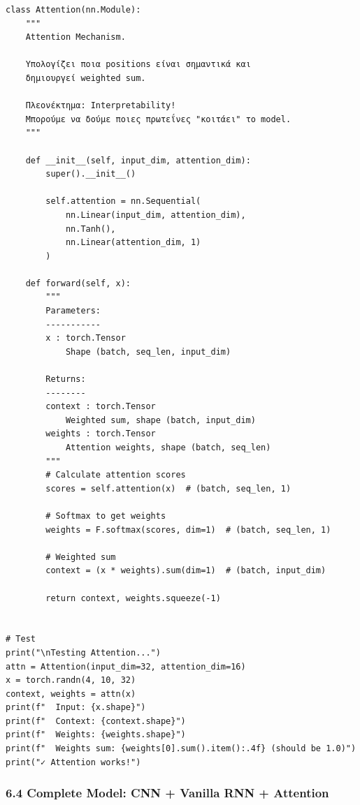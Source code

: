 \begin{lstlisting}
class Attention(nn.Module):
    """
    Attention Mechanism.
 
    Υπολογίζει ποια positions είναι σημαντικά και
    δημιουργεί weighted sum.
 
    Πλεονέκτημα: Interpretability!
    Μπορούμε να δούμε ποιες πρωτεΐνες "κοιτάει" το model.
    """
 
    def __init__(self, input_dim, attention_dim):
        super().__init__()
 
        self.attention = nn.Sequential(
            nn.Linear(input_dim, attention_dim),
            nn.Tanh(),
            nn.Linear(attention_dim, 1)
        )
 
    def forward(self, x):
        """
        Parameters:
        -----------
        x : torch.Tensor
            Shape (batch, seq_len, input_dim)
 
        Returns:
        --------
        context : torch.Tensor
            Weighted sum, shape (batch, input_dim)
        weights : torch.Tensor
            Attention weights, shape (batch, seq_len)
        """
        # Calculate attention scores
        scores = self.attention(x)  # (batch, seq_len, 1)
 
        # Softmax to get weights
        weights = F.softmax(scores, dim=1)  # (batch, seq_len, 1)
 
        # Weighted sum
        context = (x * weights).sum(dim=1)  # (batch, input_dim)
 
        return context, weights.squeeze(-1)
 
 
# Test
print("\nTesting Attention...")
attn = Attention(input_dim=32, attention_dim=16)
x = torch.randn(4, 10, 32)
context, weights = attn(x)
print(f"  Input: {x.shape}")
print(f"  Context: {context.shape}")
print(f"  Weights: {weights.shape}")
print(f"  Weights sum: {weights[0].sum().item():.4f} (should be 1.0)")
print("✓ Attention works!")
\end{lstlisting}
 
\subsubsection*{6.4 Complete Model: CNN + Vanilla RNN + Attention}
 
